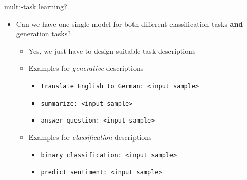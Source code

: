 
\begin{frame}{multi-task learning?}

\vfill

\begin{itemize}
	\item \ques Can we have one single model for both different classification tasks \textbf{and} generation tasks?
			\begin{itemize}
				\item Yes, we just have to design suitable task descriptions
				\item Examples for \textit{generative} descriptions 
						\begin{itemize}
							\item \texttt{translate English to German: <input sample>}
							\item \texttt{summarize: <input sample>}
							\item \texttt{answer question: <input sample>}
						\end{itemize}
				\item Examples for \textit{classification} descriptions 
						\begin{itemize}
							\item \texttt{binary classification: <input sample>}
							\item \texttt{predict sentiment: <input sample>}
						\end{itemize}
			\end{itemize}
\end{itemize}

\vfill

\end{frame}


